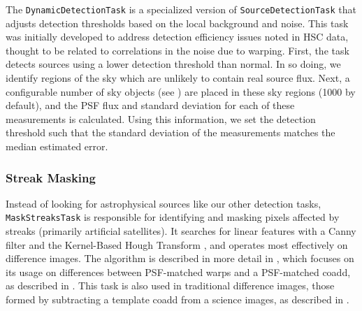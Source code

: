 The \texttt{DynamicDetectionTask} is a specialized version of \texttt{SourceDetectionTask} that adjusts detection thresholds based on the local background and noise.
This task was initially developed to address detection efficiency issues noted in HSC data, thought to be related to correlations in the noise due to warping.
First, the task detects sources using a lower detection threshold than normal.
In so doing, we identify regions of the sky which are unlikely to contain real source flux.
Next, a configurable number of sky objects (see ) are placed in these sky regions (1000 by default), and the PSF flux and standard deviation for each of these measurements is calculated.
Using this information, we set the detection threshold such that the standard deviation of the measurements matches the median estimated error.

\subsubsection{Streak Masking}
\label{sec:MaskStreaksTask}

Instead of looking for astrophysical sources like our other detection tasks, \texttt{MaskStreaksTask} is responsible for identifying and masking pixels affected by streaks (primarily artificial satellites).
It searches for linear features with a Canny filter and the Kernel-Based Hough Transform \citep{2008PatRe..41..299F}, and operates most effectively on difference images.
The algorithm is described in more detail in \citet{DMTN-197}, which focuses on its usage on differences between PSF-matched warps and a PSF-matched coadd, as described in .
This task is also used in traditional difference images, those formed by subtracting a template coadd from a science images, as described in .
